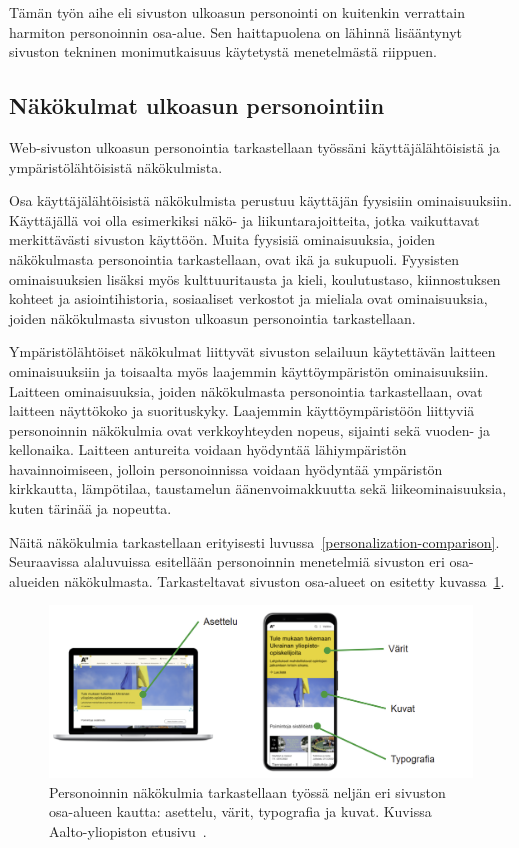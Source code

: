 \documentclass[finnish, 12pt, a4paper, elec, utf8, a-1b]{aaltothesis}
\begin{document}
Tämän työn aihe eli sivuston ulkoasun personointi on kuitenkin verrattain
harmiton personoinnin osa-alue. Sen haittapuolena on lähinnä lisääntynyt
sivuston tekninen monimutkaisuus käytetystä menetelmästä riippuen.

\subsection{Näkökulmat ulkoasun personointiin}\label{personalization-aspects}

Web-sivuston ulkoasun personointia tarkastellaan työssäni käyttäjälähtöisistä ja
ympäristölähtöisistä näkökulmista.

Osa käyttäjälähtöisistä näkökulmista perustuu käyttäjän fyysisiin
ominaisuuksiin. Käyttäjällä voi olla esimerkiksi näkö- ja liikuntarajoitteita,
jotka vaikuttavat merkittävästi sivuston käyttöön. Muita fyysisiä ominaisuuksia,
joiden näkökulmasta personointia tarkastellaan, ovat ikä ja sukupuoli. Fyysisten
ominaisuuksien lisäksi myös kulttuuritausta ja kieli, koulutustaso,
kiinnostuksen kohteet ja asiointihistoria, sosiaaliset verkostot ja mieliala
ovat ominaisuuksia, joiden näkökulmasta sivuston ulkoasun personointia
tarkastellaan.

Ympäristölähtöiset näkökulmat liittyvät sivuston selailuun käytettävän laitteen
ominaisuuksiin ja toisaalta myös laajemmin käyttöympäristön ominaisuuksiin.
Laitteen ominaisuuksia, joiden näkökulmasta personointia tarkastellaan, ovat
laitteen näyttökoko ja suorituskyky. Laajemmin käyttöympäristöön liittyviä
personoinnin näkökulmia ovat verkkoyhteyden nopeus, sijainti sekä vuoden- ja
kellonaika. Laitteen antureita voidaan hyödyntää lähiympäristön havainnoimiseen,
jolloin personoinnissa voidaan hyödyntää ympäristön kirkkautta, lämpötilaa,
taustamelun äänenvoimakkuutta sekä liikeominaisuuksia, kuten tärinää ja
nopeutta.

Näitä näkökulmia tarkastellaan erityisesti
luvussa~\ref{personalization-comparison}. Seuraavissa alaluvuissa esitellään
personoinnin menetelmiä sivuston eri osa-alueiden näkökulmasta. Tarkasteltavat
sivuston osa-alueet on esitetty kuvassa~\ref{fig:website-areas}.

\begin{figure}[h]
    \centering
    \includegraphics[width=\textwidth]{images/website-areas.png}
    \caption{Personoinnin näkökulmia tarkastellaan työssä neljän eri sivuston
    osa-alueen kautta: asettelu, värit, typografia ja kuvat. Kuvissa
    Aalto-yliopiston etusivu~\cite{aalto-website}.~\label{fig:website-areas}}
\end{figure}
\end{document}
